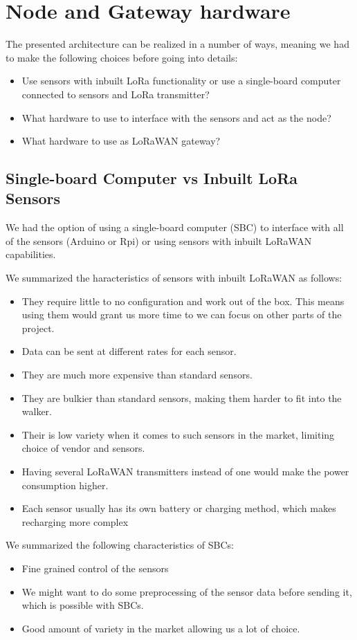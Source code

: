\section{Node and Gateway hardware}
	The presented architecture can be realized in a number of ways, meaning we had to make the following choices before going into details:

	\begin{itemize}
		\item Use sensors with inbuilt LoRa functionality or use a single-board computer connected to sensors and LoRa transmitter?
		\item What hardware to use to interface with the sensors and act as the node?
		\item What hardware to use as LoRaWAN gateway?
	\end{itemize}


	\subsection{Single-board Computer vs Inbuilt LoRa Sensors}

		We had the option of using a single-board computer (SBC) to interface with all of the sensors (Arduino or Rpi) or using sensors with inbuilt LoRaWAN capabilities.

		We summarized the haracteristics of sensors with inbuilt LoRaWAN as follows:
		\begin{itemize}
			\item They require little to no configuration and work out of the box. This means using them would grant us more time to we can focus on other parts of the project.
			\item Data can be sent at different rates for each sensor.
			\item They are much more expensive than standard sensors.
			\item They are bulkier than standard sensors, making them harder to fit into the walker.
			\item Their is low variety when it comes to such sensors in the market, limiting choice of vendor and sensors.
			\item Having several LoRaWAN transmitters instead of one would make the power consumption higher.
			\item Each sensor usually has its own battery or charging method, which makes recharging more complex
		\end{itemize}


		We summarized the following characteristics of SBCs:
		\begin{itemize}
			\item Fine grained control of the sensors
			\item We might want to do some preprocessing of the sensor data before sending it, which is possible with SBCs.
			\item Good amount of variety in the market allowing us a lot of choice.
		\end{itemize}


